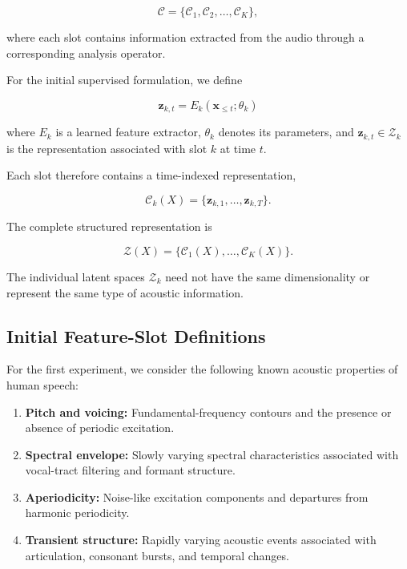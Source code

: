 \documentclass{article}
\begin{document}
\begin{equation}
    \mathcal{C}
    =
    \{\mathcal{C}_1,\mathcal{C}_2,\ldots,\mathcal{C}_K\},
\end{equation}

where each slot contains information extracted from the
audio through a corresponding analysis operator.

For the initial supervised formulation, we define

\begin{equation}
    \boxed{
    \mathbf{z}_{k,t}
    =
    E_k(\mathbf{x}_{\leq t};\theta_k)
    }
\end{equation}

where $E_k$ is a learned feature extractor,
$\theta_k$ denotes its parameters, and
$\mathbf{z}_{k,t}\in\mathcal{Z}_k$ is the representation
associated with slot $k$ at time $t$.

Each slot therefore contains a time-indexed representation,

\begin{equation}
    \mathcal{C}_k(X)
    =
    \{\mathbf{z}_{k,1},\ldots,\mathbf{z}_{k,T}\}.
\end{equation}

The complete structured representation is

\begin{equation}
    \boxed{
    \mathcal{Z}(X)
    =
    \{\mathcal{C}_1(X),\ldots,\mathcal{C}_K(X)\}.
    }
\end{equation}

The individual latent spaces $\mathcal{Z}_k$ need not have
the same dimensionality or represent the same type of
acoustic information.

\subsection{Initial Feature-Slot Definitions}

For the first experiment, we consider the following
known acoustic properties of human speech:

\begin{enumerate}
    \item \textbf{Pitch and voicing:}
    Fundamental-frequency contours and the presence
    or absence of periodic excitation.

    \item \textbf{Spectral envelope:}
    Slowly varying spectral characteristics associated
    with vocal-tract filtering and formant structure.

    \item \textbf{Aperiodicity:}
    Noise-like excitation components and departures
    from harmonic periodicity.

    \item \textbf{Transient structure:}
    Rapidly varying acoustic events associated with
    articulation, consonant bursts, and temporal changes.
\end{enumerate}
\end{document}
